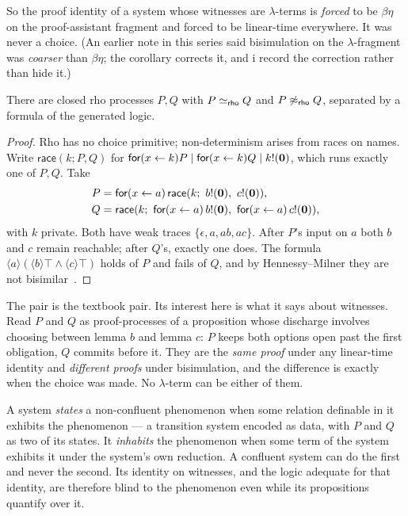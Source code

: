 So the proof identity of a system whose witnesses are $\lambda$-terms
is \emph{forced} to be $\beta\eta$ on the proof-assistant fragment and
forced to be linear-time everywhere.
It was never a choice.
(An earlier note in this series said bisimulation on the
$\lambda$-fragment was \emph{coarser} than $\beta\eta$; the corollary
corrects it, and i record the correction rather than hide it.)

\begin{proposition}
\label{inh:prop:noncollapse}
There are closed rho processes $P,Q$ with $P \simeq_{\textsf{rho}} Q$ and
$P \not\approx_{\textsf{rho}} Q$, separated by a formula of the generated
logic.
\end{proposition}

\begin{proof}
Rho has no choice primitive; non-determinism arises from races on
names.
Write $\mathsf{race}(k;P,Q)$ for
$\textsf{for}(x \leftarrow k)P \mid \textsf{for}(x \leftarrow k)Q \mid k!(\mathbf{0})$,
which runs exactly one of $P,Q$.
Take
\begin{align*}
P &= \fork(x\leftarrow a)\,\mathsf{race}(k;\ b!(\nil),\ c!(\nil)),\\
Q &= \mathsf{race}(k;\ \fork(x\leftarrow a)\,b!(\nil),\ \fork(x\leftarrow a)\,c!(\nil)),
\end{align*}
with $k$ private.
Both have weak traces $\{\epsilon, a, ab, ac\}$.
After $P$'s input on $a$ both $b$ and $c$ remain reachable; after $Q$'s,
exactly one does.
The formula $\langle a\rangle(\langle b\rangle\top \wedge \langle
c\rangle\top)$ holds of $P$ and fails of $Q$, and by Hennessy--Milner
they are not bisimilar~\cite{HennessyMilner1985}.
\end{proof}

The pair is the textbook pair.
Its interest here is what it says about witnesses.
Read $P$ and $Q$ as proof-processes of a proposition whose discharge
involves choosing between lemma $b$ and lemma $c$: $P$ keeps both
options open past the first obligation, $Q$ commits before it.
They are the \emph{same proof} under any linear-time identity and
\emph{different proofs} under bisimulation, and the difference is
exactly when the choice was made.
No $\lambda$-term can be either of them.

\begin{observation}
\label{inh:obs:inhabit}
A system \emph{states} a non-confluent phenomenon when some relation
definable in it exhibits the phenomenon --- a transition system encoded
as data, with $P$ and $Q$ as two of its states.
It \emph{inhabits} the phenomenon when some term of the system exhibits
it under the system's own reduction.
A confluent system can do the first and never the second.
Its identity on witnesses, and the logic adequate for that identity,
are therefore blind to the phenomenon even while its propositions
quantify over it.
\end{observation}

